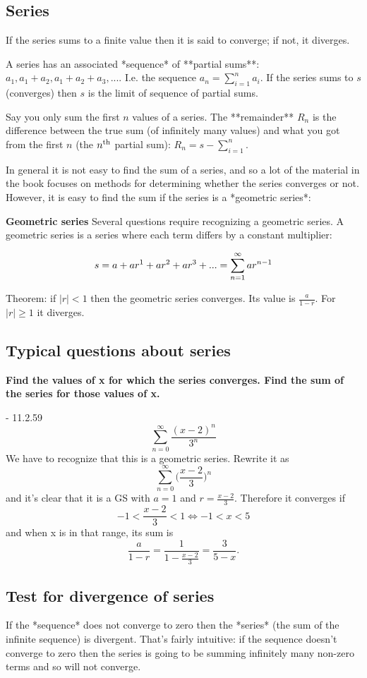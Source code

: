 \subsection{Series}

If the series sums to a finite value then it is said to converge; if not, it diverges.

A series has an associated *sequence* of **partial sums**: $a_1, a_1 + a_2, a_1 + a_2 + a_3, ...$. I.e. the sequence $a_n = \sum_{i=1}^n a_i$. If the series sums to $s$ (converges) then $s$ is the limit of sequence of partial sums.

Say you only sum the first $n$ values of a series. The **remainder** $R_n$ is the difference between the true sum (of infinitely many values) and what you got from the first $n$ (the $n^{\text{th}}$ partial sum): $R_n = s - \sum_{i=1}^n$.



In general it is not easy to find the sum of a series, and so a lot of the material in the book focuses on methods for determining whether the series converges or not. However, it is easy to find the sum if the series is a *geometric series*:

\textbf*{Geometric series}
Several questions require recognizing a geometric series. A geometric series is a series where each term differs by a constant multiplier:

$$
s = a + ar^1 + ar^2 + ar^3 + ... = \sum_{n=1}^{\infty} ar^{n-1}
$$

Theorem: if $|r| < 1$ then the geometric series converges. Its value is $\frac{a}{1-r}$. For $|r| \geq 1$ it diverges.

\subsection{Typical questions about series}

\textbf*{Find the values of x for which the series converges. Find the sum of the series for those values of x.}

- 11.2.59
  $$
  \sum_{n=0}^{\infty} \frac{(x-2)^n}{3^n}
  $$
  We have to recognize that this is a geometric series. Rewrite it as
  $$
  \sum_{n=0}^{\infty} \Big(\frac{x-2}{3}\Big)^n
  $$
  and it's clear that it is a GS with $a=1$ and $r=\frac{x-2}{3}$. Therefore it converges if
  $$
  -1 < \frac{x-2}{3} < 1 \Leftrightarrow -1 < x < 5
  $$
  and when x is in that range, its sum is
  $$
  \frac{a}{1-r} = \frac{1}{1 - \frac{x-2}{3}} = \frac{3}{5-x}.
  $$

\subsection{Test for divergence of series}
If the *sequence* does not converge to zero then the *series* (the sum of the infinite sequence) is divergent. That's fairly intuitive: if the sequence doesn't converge to zero then the series is going to be summing infinitely many non-zero terms and so will not converge.

